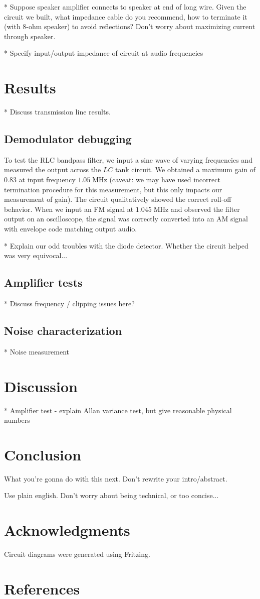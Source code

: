 \documentclass[11pt]{article}
\newcommand {\mt}{\mathrm}
\newcommand {\unit}[1]{\; \mt{#1}}
\begin{document}
* Suppose speaker amplifier connects to speaker at end of long wire.  Given the circuit we built, what impedance cable do you recommend, how to terminate it (with 8-ohm speaker) to avoid reflections?  Don't worry about maximizing current through speaker.

* Specify input/output impedance of circuit at audio frequencies



\section{Results}

* Discuss transmission line results.

\subsection{Demodulator debugging}

To test the RLC bandpass filter, we input a sine wave of varying frequencies
and measured the output across the $LC$ tank circuit.  We obtained a maximum
gain of $0.83$ at input frequency $1.05 \unit{MHz}$ (caveat: we may have used
incorrect termination procedure for this measurement, but this only impacts our
measurement of gain).  The circuit qualitatively showed the correct roll-off
behavior.  When we input an FM signal at $1.045 \unit{MHz}$ and observed the
filter output on an oscilloscope, the signal was correctly converted into
an AM signal with envelope code matching output audio.

* Explain our odd troubles with the diode detector.  Whether the circuit helped was very equivocal...

\subsection{Amplifier tests}

* Discuss frequency / clipping issues here?

\subsection{Noise characterization}

* Noise measurement

\section{Discussion}

* Amplifier test - explain Allan variance test, but give reasonable physical numbers

\section{Conclusion}

What you're gonna do with this next.  Don't rewrite your intro/abstract.

Use plain english.  Don't worry about being technical, or too concise...

\section{Acknowledgments}

Circuit diagrams were generated using Fritzing.

\section{References}
\end{document}
